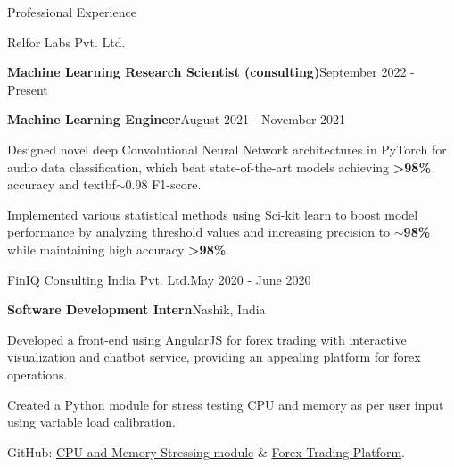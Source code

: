 \documentclass{resume} %
\begin{document}
\begin{rSection}{Professional Experience}
\begin{rSubsection}{Relfor Labs Pvt. Ltd.}
\begin{rSubsubsection}{\textbf{Machine Learning Research Scientist (consulting)}}{September 2022 - Present}{}
\end{rSubsubsection}\vspace{-1em}
\begin{rSubsubsection}{\textbf{Machine Learning Engineer}}{August 2021 - November 2021}{}
    \item Designed novel deep Convolutional Neural Network architectures in PyTorch for audio data classification, which beat state-of-the-art models achieving \textbf{>98\%} accuracy and textbf{$\sim$0.98} F1-score.
    \item Implemented various statistical methods using Sci-kit learn to boost model performance by analyzing threshold values and increasing precision to \textbf{$\sim$98\%} while maintaining high accuracy \textbf{>98\%}.
\end{rSubsubsection}
\vspace{-0.4em}
\end{rSubsection}
\vspace{-0.4em}
\hdashrule[1pt]{19cm}{0.5pt}{1mm 1mm}
\begin{rSubsection}{FinIQ Consulting India Pvt. Ltd.}{May 2020 - June 2020}{}{}
\begin{rSubsubsection}{\textbf{Software Development Intern}}{Nashik, India}{}
\item Developed a front-end using AngularJS for forex trading with interactive visualization and chatbot service, providing an appealing platform for forex operations.
\item Created a Python module for stress testing CPU and memory as per user input using variable load calibration.
\item GitHub: \href{https://github.com/obi-wan-shinobi/Stress-test}{CPU and Memory Stressing module} \& \href{https://github.com/obi-wan-shinobi/Forex-Trading}{Forex Trading Platform}.
\end{rSubsubsection}
\end{rSubsection}


\end{rSection}
\smallskip

\end{document}
